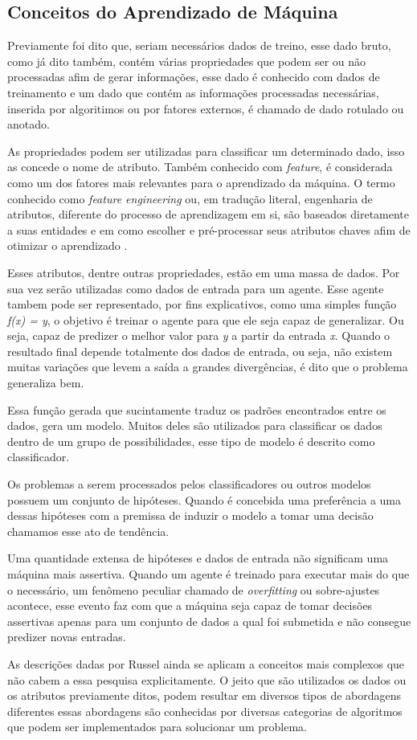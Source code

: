 \subsection{Conceitos do Aprendizado de Máquina}
Previamente foi dito que, seriam necessários dados de treino, esse dado bruto, como já dito também, contém várias propriedades que podem ser ou não processadas afim de gerar informações, esse dado é conhecido com dados de treinamento e um dado que contém as informações processadas necessárias, inserida por algoritimos ou por fatores externos, é chamado de dado rotulado ou anotado.

As propriedades podem ser utilizadas para classificar um determinado dado, isso as concede o nome de atributo. Também conhecido com \textit{feature}, é considerada como um dos fatores mais relevantes para o aprendizado da máquina. O termo conhecido como \textit{feature engineering} ou, em tradução literal, engenharia de atributos, diferente do processo de aprendizagem em si, são baseados diretamente a suas entidades e em como escolher e pré-processar seus atributos chaves afim de otimizar o aprendizado \cite{domingos2012few}.

Esses atributos, dentre outras propriedades, estão em uma massa de dados. Por sua vez serão utilizadas como dados de entrada para um agente. Esse agente tambem pode ser representado, por fins explicativos, como uma simples função \textit{f(x) = y}, o objetivo é treinar o agente para que ele seja capaz de generalizar. Ou seja, capaz de predizer o melhor valor para \textit{y} a partir da entrada \textit{x}. Quando o resultado final depende totalmente dos dados de entrada, ou seja, não existem muitas variações que levem a saída a grandes divergências, é dito que o problema generaliza bem.

Essa função gerada que sucintamente traduz os padrões encontrados entre os dados, gera um modelo. Muitos deles são utilizados para classificar os dados dentro de um grupo de possibilidades, esse tipo de modelo é descrito como classificador.

Os problemas a serem processados pelos classificadores ou outros modelos possuem um conjunto de  hipóteses. Quando é concebida uma preferência a uma dessas hipóteses com a premissa de induzir o modelo a tomar uma decisão chamamos esse ato de tendência.

Uma quantidade extensa de hipóteses e dados de entrada não significam uma máquina mais assertiva. Quando um agente é treinado para executar mais do que o necessário, um fenômeno peculiar chamado de \textit{overfitting} ou sobre-ajustes acontece, esse evento faz com que a máquina seja capaz de tomar decisões assertivas apenas para um conjunto de dados a qual foi submetida e não consegue predizer novas entradas.

As descrições dadas por Russel \cite[693]{russell2003artificial} ainda se aplicam a conceitos mais complexos que não cabem a essa pesquisa explicitamente. O jeito que são utilizados os dados ou os atributos previamente ditos, podem resultar em diversos tipos de abordagens diferentes essas abordagens são conhecidas por diversas categorias de algoritmos que podem ser implementados para solucionar um problema.
